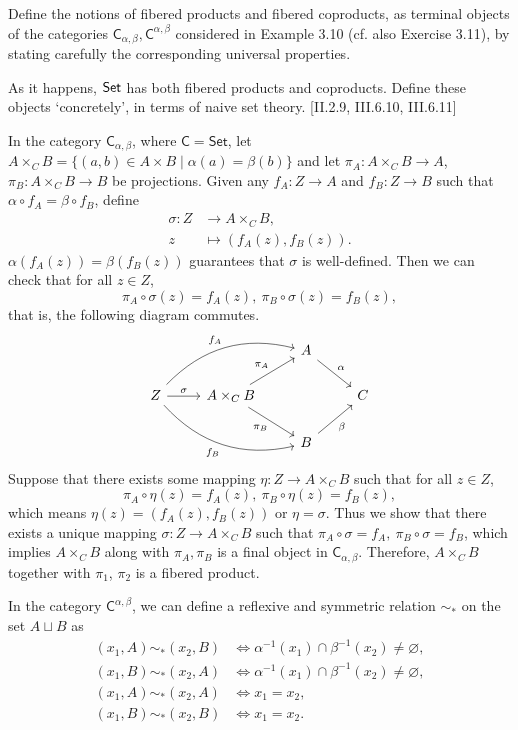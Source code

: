 \begin{problem}[5.12]
	Define the notions of fibered products and fibered coproducts, as terminal objects of the categories $\mathsf{C}_{\alpha,\beta},\mathsf{C}^{\alpha,\beta}$ considered in
	Example 3.10 (cf. also Exercise 3.11), by stating carefully the corresponding
	universal properties.
	
	As it happens, $\mathsf{Set}$ has both fibered products and coproducts. Define these
	objects `concretely', in terms of naive set theory. [II.2.9, III.6.10, III.6.11]
\end{problem}
\begin{solution}
	In the category $\mathsf{C}_{\alpha,\beta}$, where $\mathsf{C} = \mathsf{Set}$, let $A\times_C B=\{(a,b)\in A\times B\mid\alpha(a)=\beta(b)\}$ and let $\pi_A:A\times_C B\to A$, $\pi_B:A\times_C B\to B$ be projections. Given any $f_A:Z\to A$ and $f_B:Z\to B$ such that $\alpha\circ f_A=\beta\circ f_B$, define
	\[
	\begin{aligned}
	\sigma:Z&\longrightarrow A\times_C B, \\  
	z&\longmapsto (f_A(z),f_B(z)).
	\end{aligned}
	\]
	$\alpha(f_A(z))=\beta(f_B(z))$ guarantees that $\sigma$ is well-defined. Then we can check that for all $z\in Z$,
	\[
	\pi_A\circ\sigma(z)=f_A(z),\ \pi_B\circ\sigma(z)=f_B(z),
	\]
	that is, the following diagram commutes.
	\[\begin{tikzcd}
	&& A\arrow[dr,"\alpha"]&\\
	Z\arrow[r,"\sigma"]\arrow[urr,bend left,"f_A"]\arrow[drr,bend right,swap,"f_B"]
	&A\times_C B\arrow[ur,"\pi_A"]\arrow[dr,swap,"\pi_B"]&&C \\
	&& B\arrow[ur,swap,"\beta"]&
	\end{tikzcd}\]
	Suppose that there exists some mapping $\eta:Z\to A\times_C B$ such that for all $z\in Z$,
	\[
	\pi_A\circ\eta(z)=f_A(z),\ \pi_B\circ\eta(z)=f_B(z),
	\]
	which means $\eta(z)=(f_A(z),f_B(z))$ or $\eta=\sigma$. Thus we show that there exists a unique mapping $\sigma:Z\to A\times_C B$ such that $\pi_A\circ\sigma=f_A,\ \pi_B\circ\sigma=f_B$, which implies $A\times_C B$ along with $\pi_A,\pi_B$ is a final object in $\mathsf{C}_{\alpha,\beta}$. Therefore, $A\times_C B$ together with $\pi_1$, $\pi_2$ is a fibered product.
	
	In the category $\mathsf{C}^{\alpha,\beta}$, we can define a reflexive and symmetric relation $\sim_*$ on the set $A\sqcup B$ as
	\begin{align*}
	(x_1,A)\sim_* (x_2,B)&\iff \alpha^{-1}(x_1)\cap\beta^{-1}(x_2)\ne\varnothing,\\
	(x_1,B)\sim_* (x_2,A)&\iff \alpha^{-1}(x_1)\cap\beta^{-1}(x_2)\ne\varnothing,\\
	(x_1,A)\sim_*(x_2,A)&\iff x_1=x_2,\\
	(x_1,B)\sim_*(x_2,B)&\iff x_1=x_2.
	\end{align*}


\end{solution}
